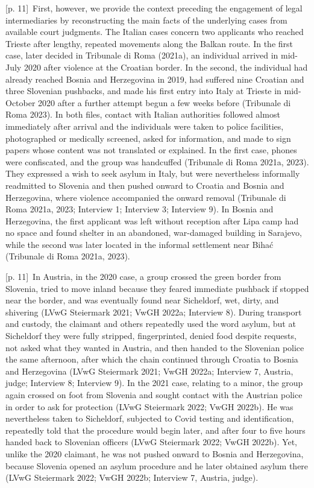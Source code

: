 \documentclass[10pt,a4paper]{article}
\begin{document}
{\scriptsize\color{gray} [p. 11]}\ First, however, we provide the context preceding the engagement of legal intermediaries by reconstructing the main facts of the underlying cases from available court judgments. The Italian cases concern two applicants who reached Trieste after lengthy, repeated movements along the Balkan route. In the first case, later decided in Tribunale di Roma (2021a), an individual arrived in mid-July 2020 after violence at the Croatian border. In the second, the individual had already reached Bosnia and Herzegovina in 2019, had suffered nine Croatian and three Slovenian pushbacks, and made his first entry into Italy at Trieste in mid-October 2020 after a further attempt begun a few weeks before (Tribunale di Roma 2023). In both files, contact with Italian authorities followed almost immediately after arrival and the individuals were taken to police facilities, photographed or medically screened, asked for information, and made to sign papers whose content was not translated or explained. In the first case, phones were confiscated, and the group was handcuffed (Tribunale di Roma 2021a, 2023). They expressed a wish to seek asylum in Italy, but were nevertheless informally readmitted to Slovenia and then pushed onward to Croatia and Bosnia and Herzegovina, where violence accompanied the onward removal (Tribunale di Roma 2021a, 2023; Interview 1; Interview 3; Interview 9). In Bosnia and Herzegovina, the first applicant was left without reception after Lipa camp had no space and found shelter in an abandoned, war-damaged building in Sarajevo, while the second was later located in the informal settlement near Bihać (Tribunale di Roma 2021a, 2023).\par
{\scriptsize\color{gray} [p. 11]}\ In Austria, in the 2020 case, a group crossed the green border from Slovenia, tried to move inland because they feared immediate pushback if stopped near the border, and was eventually found near Sicheldorf, wet, dirty, and shivering (LVwG Steiermark 2021; VwGH 2022a; Interview 8). During transport and custody, the claimant and others repeatedly used the word asylum, but at Sicheldorf they were fully stripped, fingerprinted, denied food despite requests, not asked what they wanted in Austria, and then handed to the Slovenian police the same afternoon, after which the chain continued through Croatia to Bosnia and Herzegovina (LVwG Steiermark 2021; VwGH 2022a; Interview 7, Austria, judge; Interview 8; Interview 9). In the 2021 case, relating to a minor, the group again crossed on foot from Slovenia and sought contact with the Austrian police in order to ask for protection (LVwG Steiermark 2022; VwGH 2022b). He was nevertheless taken to Sicheldorf, subjected to Covid testing and identification, repeatedly told that the procedure would begin later, and after four to five hours handed back to Slovenian officers (LVwG Steiermark 2022; VwGH 2022b). Yet, unlike the 2020 claimant, he was not pushed onward to Bosnia and Herzegovina, because Slovenia opened an asylum procedure and he later obtained asylum there (LVwG Steiermark 2022; VwGH 2022b; Interview 7, Austria, judge).\par
\end{document}

